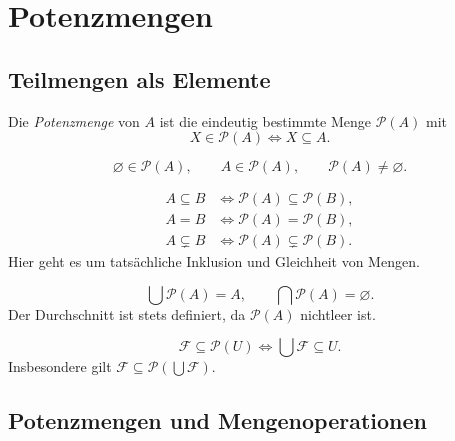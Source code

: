 \chapter{Potenzmengen}

\section{Teilmengen als Elemente}

\begin{definition}[Potenzmenge]
Die \emph{Potenzmenge} von $A$ ist die eindeutig bestimmte Menge
$\mathcal P(A)$ mit
\[
 X\in\mathcal P(A)\Longleftrightarrow X\subseteq A.
\]
\end{definition}

\begin{theorem}
\[
 \varnothing\in\mathcal P(A),\qquad A\in\mathcal P(A),\qquad
 \mathcal P(A)\ne\varnothing.
\]
\end{theorem}

\begin{theorem}
\label{b03guide:thm:powercomparison}
\[
\begin{aligned}
 A\subseteq B&\Longleftrightarrow
                     \mathcal P(A)\subseteq\mathcal P(B),\\
 A=B&\Longleftrightarrow\mathcal P(A)=\mathcal P(B),\\
 A\subsetneq B&\Longleftrightarrow
                     \mathcal P(A)\subsetneq\mathcal P(B).
\end{aligned}
\]
Hier geht es um tatsächliche Inklusion und Gleichheit von Mengen.
\cite{hammack}
\end{theorem}

\begin{theorem}
\[
 \bigcup\mathcal P(A)=A,\qquad \bigcap\mathcal P(A)=\varnothing.
\]
Der Durchschnitt ist stets definiert, da $\mathcal P(A)$ nichtleer ist.
\end{theorem}

\begin{theorem}
\[
 \mathcal F\subseteq\mathcal P(U)
       \Longleftrightarrow \bigcup\mathcal F\subseteq U.
\]
Insbesondere gilt
$\mathcal F\subseteq\mathcal P(\bigcup\mathcal F)$.
\end{theorem}

\section{Potenzmengen und Mengenoperationen}

